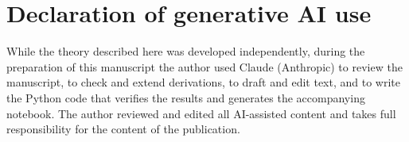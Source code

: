 \documentclass[anonymous]{iopjournal}
\begin{document}



\section*{Declaration of generative AI use}
While the theory described here was developed independently, during the preparation of this manuscript the author used Claude (Anthropic) to review the manuscript, to check and extend derivations, to draft and edit text, and to write the Python code that verifies the results and generates the accompanying notebook. The author reviewed and edited all AI-assisted content and takes full responsibility for the content of the publication.

\printbibliography
\end{document}
